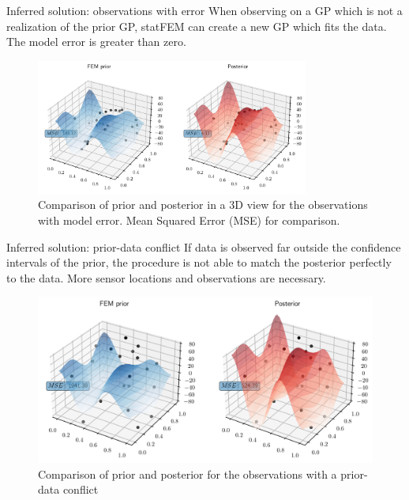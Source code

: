 \documentclass[fleqn,11pt,aspectratio=43]{beamer}
\begin{document}
\begin{frame}{Inferred solution: observations with error}
When observing on a GP which is not a realization of the prior GP, statFEM can create a new GP which fits the data. The model error is greater than zero.
\begin{figure}[!ht]
\includegraphics[width=0.8\textwidth]{3dTest.pdf}
\centering
\caption{Comparison of prior and posterior in a 3D view for the observations with model error. Mean Squared Error (MSE) for comparison.}
\end{figure}
\end{frame}


\begin{frame}{Inferred solution: prior-data conflict}
If data is observed far outside the confidence intervals of the prior, the procedure is not able to match the posterior perfectly to the data. More sensor locations and observations are necessary.
\begin{figure}
\includegraphics[width=.8\textwidth]{../../Python/Results/2D/prior_data_conflict/3dMSE.pdf}
\centering
\caption{Comparison of prior and posterior for the observations with a prior-data conflict}
\end{figure}

\end{frame}
\end{document}
